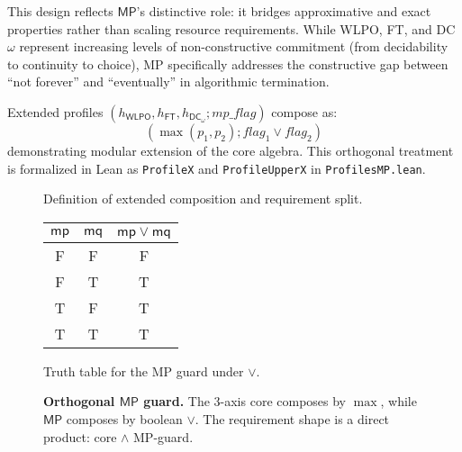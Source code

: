 \documentclass[11pt]{article}
\newcommand{\WLPO}{\mathsf{WLPO}}
\newcommand{\FT}{\mathsf{FT}}
\newcommand{\DCw}{\mathsf{DC}_{\omega}}
\newcommand{\MP}{\mathsf{MP}}
\newcommand{\lean}[1]{\texttt{#1}}
\theoremstyle{plain}
\theoremstyle{definition}
\theoremstyle{remark}
\newcommand{\HasMP}{\mathsf{HasMP}}
\newcommand{\Requires}{\mathsf{Requires}}
\newcommand{\RequiresX}{\mathsf{RequiresX}}
\begin{document}
This design reflects $\MP$'s distinctive role: it bridges approximative and exact properties rather than scaling resource requirements. While WLPO, FT, and DC$\omega$ represent increasing levels of non-constructive commitment (from decidability to continuity to choice), MP specifically addresses the constructive gap between ``not forever'' and ``eventually'' in algorithmic termination.

Extended profiles $(h_{\WLPO}, h_{\FT}, h_{\DCw}; \mathit{mp\_flag})$ compose as:
$$(\max(p_1, p_2); \mathit{flag}_1 \lor \mathit{flag}_2)$$
demonstrating modular extension of the core algebra. This orthogonal treatment is formalized in Lean as \lean{ProfileX} and \lean{ProfileUpperX} in \texttt{ProfilesMP.lean}.

\begin{figure}[t]
  \centering
  \begin{minipage}[t]{0.47\linewidth}
    \centering
    \fbox{%
    \begin{minipage}{0.92\linewidth}
      \vspace{0.35em}
      \[
        (p,\mathsf{mp}) \boxplus (q,\mathsf{mq})
        \;=\; \big(\max(p,q),\, \mathsf{mp}\lor\mathsf{mq}\big).
      \]
      \[
        \RequiresX\big((p,\mathsf{mp}),F\big)
        \;:=\; \Requires(p,F)\wedge\big(\mathsf{mp}\Rightarrow\HasMP(F)\big).
      \]
      \vspace{0.1em}
    \end{minipage}}
    \vspace{0.6em}

    \small Definition of extended composition and requirement split.
  \end{minipage}\hfill
  \begin{minipage}[t]{0.47\linewidth}
    \centering
    \setlength{\tabcolsep}{10pt}
    \renewcommand{\arraystretch}{1.2}
    \begin{tabular}{cc|c}
      $\mathsf{mp}$ & $\mathsf{mq}$ & $\mathsf{mp}\lor\mathsf{mq}$ \\\hline
      F & F & F \\
      F & T & T \\
      T & F & T \\
      T & T & T \\
    \end{tabular}

    \vspace{0.6em}
    \small Truth table for the MP guard under $\lor$.
  \end{minipage}

  \caption{\textbf{Orthogonal $\MP$ guard.}
  The 3-axis core composes by $\max$, while $\MP$ composes by boolean $\lor$.
  The requirement shape is a direct product: core $\wedge$ MP-guard.}
  \label{fig:mp-orthogonal}
\end{figure}
\end{document}
